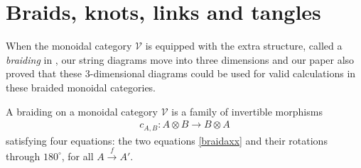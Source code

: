 \documentclass[a4paper,12pt]{article}
\theoremstyle{step}
\newcommand{\lra}{\longrightarrow}
\newcommand{\xra}{\xrightarrow}
\def\CV{{\mathscr V}}
\begin{document}
\section{Braids, knots, links and tangles}\label{Bklt}

When the monoidal category $\CV$ is equipped with the extra structure, called a {\em braiding} in \cite{ix, BTC}, our string diagrams move into three dimensions and our paper \cite{GTC} also proved that these 3-dimensional diagrams could be used for valid calculations in these braided monoidal categories.

A braiding on a monoidal category $\CV$ is a family of invertible morphisms 
\begin{eqnarray*}
c_{A,B} : A \otimes B  \lra  B \otimes A
\end{eqnarray*}
satisfying four equations: the two equations \eqref{braidaxx} and their rotations through $180^{\circ}$, for all $A\xra{f}A'$.
\end{document}
